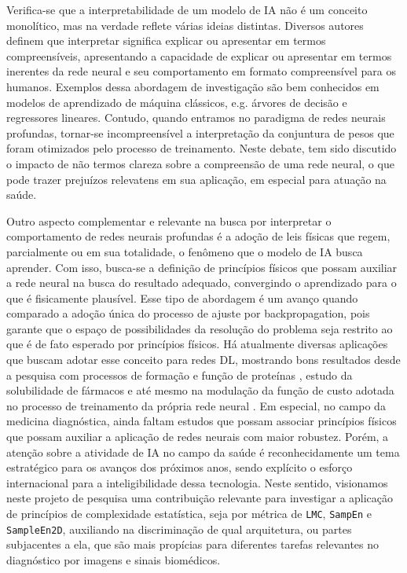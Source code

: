 \documentclass[
	12pt,				%
	openany,oneside,
	a4paper,			%
	english,			%
	brazil,				%
	]{abntex2}
\begin{document}
Verifica-se que a interpretabilidade de um modelo de IA não é um conceito monolítico, mas na verdade reflete várias ideias distintas. Diversos autores definem que interpretar significa explicar ou apresentar em termos compreensíveis, apresentando a capacidade de explicar ou apresentar em termos inerentes da rede neural e seu comportamento em formato compreensível para os humanos. \cite{Murdoch2019,DoshiVelez2017} Exemplos dessa abordagem de investigação são bem conhecidos em modelos de aprendizado de máquina clássicos, e.g. árvores de decisão e regressores lineares. Contudo, quando entramos no paradigma de redes neurais profundas, tornar-se incompreensível a interpretação da conjuntura de pesos que foram otimizados pelo processo de treinamento. Neste debate, tem sido discutido o impacto de não termos clareza sobre a compreensão de uma rede neural, o que pode trazer prejuízos relevatens em sua aplicação, em especial para atuação na saúde. \cite{Rudin2018} 

Outro aspecto complementar e relevante na busca por interpretar o comportamento de redes neurais profundas é a adoção de leis físicas que regem, parcialmente ou em sua totalidade, o fenômeno que o modelo de IA busca aprender. Com isso, busca-se a definição de princípios físicos que possam auxiliar a rede neural na busca do resultado adequado, convergindo o aprendizado para o que é fisicamente plausível. \cite{Rajulapati2022} Esse tipo de abordagem é um avanço quando comparado a adoção única do processo de ajuste por backpropagation, pois garante que o espaço de possibilidades da resolução do problema seja restrito ao que é de fato esperado por princípios físicos. Há atualmente diversas aplicações que buscam adotar esse conceito para redes DL, mostrando bons resultados desde a pesquisa com processos de formação e função de proteínas \cite{Bonetta2020}, estudo da solubilidade de fármacos \cite{Jouyban2011} e até mesmo na modulação da função de custo adotada no processo de treinamento da própria rede neural \cite{Beucler2021}. Em especial, no campo da medicina diagnóstica, ainda faltam estudos que possam associar princípios físicos que possam auxiliar a aplicação de redes neurais com maior robustez. Porém, a atenção sobre a atividade de IA no campo da saúde é reconhecidamente um tema estratégico para os avanços dos próximos anos, sendo explícito o esforço internacional para a inteligibilidade dessa tecnologia. \cite{WHO2021,Aranovich2023} Neste sentido, visionamos neste projeto de pesquisa uma contribuição relevante para investigar a aplicação de princípios de complexidade estatística, seja por métrica de \texttt{LMC}, \texttt{SampEn} e \texttt{SampleEn2D}, auxiliando na discriminação de qual arquitetura, ou partes subjacentes a ela, que são mais propícias para diferentes tarefas relevantes no diagnóstico por imagens e sinais biomédicos.
\end{document}
